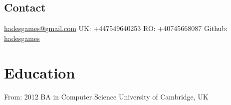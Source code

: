 \documentclass[]{friggeri-cv}
\begin{document}
       {}

\begin{aside}
  \section{Contact}
    \href{mailto:hadesgames@gmail.com}{hadesgames@gmail.com}
    UK: +447549640253
    RO: +40745668087
    Github: \href{http://github.com/hadesgames}{hadesgames}
\end{aside}


\section{Education}

\begin{entrylist}
  \entry
    {From: 2012}
    {}
    {BA in Computer Science}
    {}
    {University of Cambridge, UK}
   
\end{entrylist}
\end{document}
